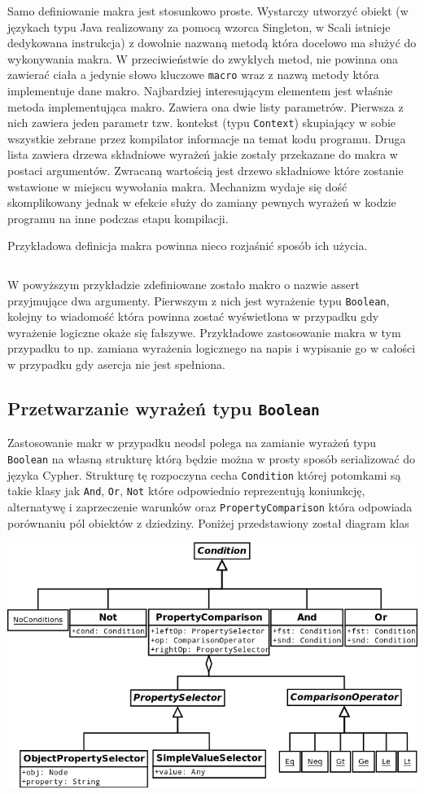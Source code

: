\documentclass[brudnopis]{xmgr}
\begin{document}
Samo definiowanie makra jest stosunkowo proste. Wystarczy utworzyć obiekt (w językach typu Java realizowany za pomocą wzorca Singleton, w Scali istnieje dedykowana instrukcja) z dowolnie nazwaną metodą która docelowo ma służyć do wykonywania makra. W przeciwieństwie do zwykłych metod, nie powinna ona zawierać ciała a jedynie słowo kluczowe \texttt{macro} wraz z nazwą metody która implementuje dane makro. Najbardziej interesującym elementem jest właśnie metoda implementująca makro. Zawiera ona dwie listy parametrów. Pierwsza z nich zawiera jeden parametr tzw. kontekst (typu \texttt{Context}) skupiający w sobie wszystkie zebrane przez kompilator informacje na temat kodu programu. Druga lista zawiera drzewa składniowe wyrażeń jakie zostały przekazane do makra w postaci argumentów. Zwracaną wartością jest drzewo składniowe które zostanie wstawione w miejscu wywołania makra. Mechanizm wydaje się dość skomplikowany jednak w efekcie służy do zamiany pewnych wyrażeń w kodzie programu na inne podczas etapu kompilacji.

Przykładowa definicja makra powinna nieco rozjaśnić sposób ich użycia.

\inputminted{scala}{listings/scala/macro-sample.scala}

W powyższym przykładzie zdefiniowane zostało makro o nazwie assert przyjmujące dwa argumenty. Pierwszym z nich jest wyrażenie typu \texttt{Boolean}, kolejny to wiadomość która powinna zostać wyświetlona w przypadku gdy wyrażenie logiczne okaże się fałszywe. Przykładowe zastosowanie makra w tym przypadku to np. zamiana wyrażenia logicznego na napis i wypisanie go w całości w przypadku gdy asercja nie jest spełniona.

\subsection{Przetwarzanie wyrażeń typu \texttt{Boolean}}

Zastosowanie makr w przypadku neodsl polega na zamianie wyrażeń typu \texttt{Boolean} na własną strukturę którą będzie można w prosty sposób serializować do języka Cypher. 
Strukturę tę rozpoczyna cecha \texttt{Condition} której potomkami są takie klasy jak \texttt{And}, \texttt{Or}, \texttt{Not} które odpowiednio reprezentują koniunkcję, alternatywę i zaprzeczenie warunków oraz \texttt{PropertyComparison} która odpowiada porównaniu pól obiektów z dziedziny. Poniżej przedstawiony został diagram klas

\includegraphics[scale=0.5]{images/conditions-uml.png}
\end{document}
